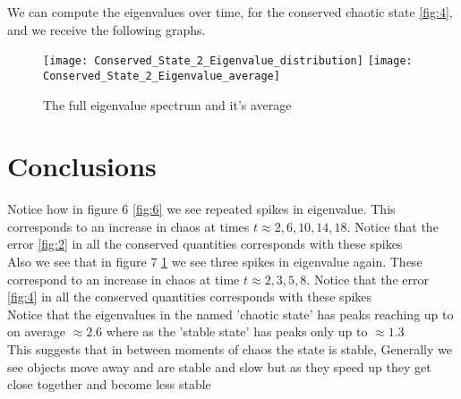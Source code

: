 We can compute the eigenvalues over time, for the conserved chaotic state \ref{fig:4}, and we receive the following graphs.	
\begin{center}
\begin{figure}[h]
\texttt{[image: Conserved\_State\_2\_Eigenvalue\_distribution]}
\texttt{[image: Conserved\_State\_2\_Eigenvalue\_average]}
\label{fig:7}\caption{The full eigenvalue spectrum and it's average}
\end{figure}
\end{center}








\chapter{Conclusions}

Notice how in figure 6 \ref{fig:6} we see repeated spikes in eigenvalue. This corresponds to an increase in chaos at times $t\approx2, 6, 10, 14, 18$. Notice that the error \ref{fig:2} in all the conserved quantities corresponds with these spikes\\
Also we see that in figure 7 \ref{fig:7} we see three spikes in eigenvalue again. These correspond to an increase in chaos at time $t \approx 2, 3, 5, 8$. Notice that the error \ref{fig:4} in all the conserved quantities corresponds with these spikes\\

Notice that the eigenvalues in the named 'chaotic state' has peaks reaching up to on average $\approx2.6$ where as the 'stable state' has peaks only up to $\approx 1.3$\\

This suggests that in between moments of chaos the state is stable, Generally we see objects move away and are stable and slow but as they speed up they get close together and become less stable\\

